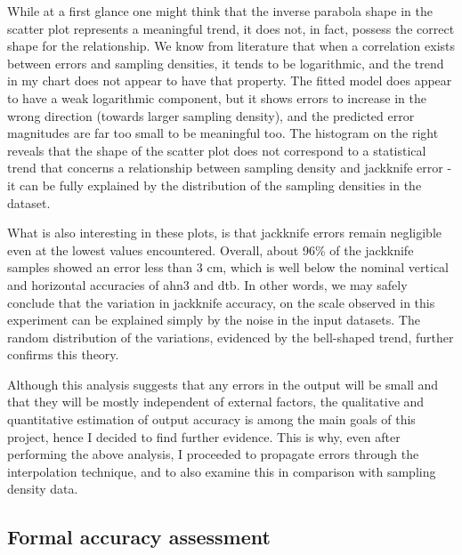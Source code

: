While at a first glance one might think that the inverse parabola shape in the scatter plot represents a meaningful trend, it does not, in fact, possess the correct shape for the relationship. We know from literature that when a correlation exists between errors and sampling densities, it tends to be logarithmic, and the trend in my chart does not appear to have that property. The fitted model does appear to have a weak logarithmic component, but it shows errors to increase in the wrong direction (towards larger sampling density), and the predicted error magnitudes are far too small to be meaningful too. The histogram on the right reveals that the shape of the scatter plot does not correspond to a statistical trend that concerns a relationship between sampling density and jackknife error - it can be fully explained by the distribution of the sampling densities in the dataset.

What is also interesting in these plots, is that jackknife errors remain negligible even at the lowest values encountered. Overall, about 96\% of the jackknife samples showed an error less than 3 cm, which is well below the nominal vertical and horizontal accuracies of \ac{ahn3} and \ac{dtb}. In other words, we may safely conclude that the variation in jackknife accuracy, on the scale observed in this experiment can be explained simply by the noise in the input datasets. The random distribution of the variations, evidenced by the bell-shaped trend, further confirms this theory.

Although this analysis suggests that any errors in the output will be small and that they will be mostly independent of external factors, the qualitative and quantitative estimation of output accuracy is among the main goals of this project, hence I decided to find further evidence. This is why, even after performing the above analysis, I proceeded to propagate errors through the interpolation technique, and to also examine this in comparison with sampling density data.

\subsection{Formal accuracy assessment}
\label{sub:accuracyformal}

